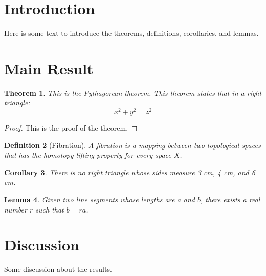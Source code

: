 \documentclass{article}
\newtheorem{theorem}{Theorem}[section]
\newtheorem{definition}[theorem]{Definition}
\newtheorem{corollary}[theorem]{Corollary}
\newtheorem{lemma}[theorem]{Lemma}
\begin{document}
\section{Introduction}
Here is some text to introduce the theorems, definitions, corollaries, and lemmas.
\section{Main Result}
\begin{theorem}
This is the Pythagorean theorem.
\label{pythagorean}
This theorem states that in a right triangle:
\[x^2 + y^2 = z^2\]
\end{theorem}
\begin{proof}
This is the proof of the theorem.
\end{proof}
\begin{definition}[Fibration]
A fibration is a mapping between two topological spaces that has the homotopy lifting
property for every space \(X\).
\end{definition}
\begin{corollary}
There is no right triangle whose sides measure 3 cm, 4 cm, and 6 cm.
\end{corollary}
\begin{lemma}
Given two line segments whose lengths are \(a\) and \(b\), there exists a real number \(r\) such
that \(b = ra\).
\end{lemma}
\section{Discussion}
Some discussion about the results.
\end{document}
